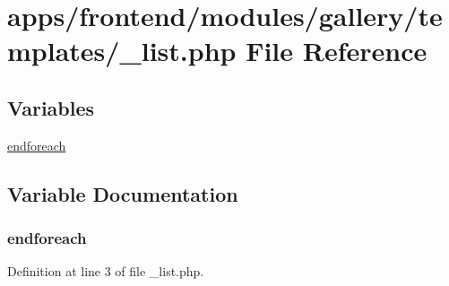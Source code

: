 \hypertarget{frontend_2modules_2gallery_2templates_2__list_8php}{\section{apps/frontend/modules/gallery/templates/\-\_\-list.php File Reference}
\label{frontend_2modules_2gallery_2templates_2__list_8php}
}
\subsection*{Variables}
\begin{DoxyCompactItemize}
\item 
\hyperlink{frontend_2modules_2gallery_2templates_2__list_8php_a672d9707ef91db026c210f98cc601123}{endforeach}
\end{DoxyCompactItemize}


\subsection{Variable Documentation}
\hypertarget{frontend_2modules_2gallery_2templates_2__list_8php_a672d9707ef91db026c210f98cc601123}{
\subsubsection[{endforeach}]{\setlength{\rightskip}{0pt plus 5cm}endforeach}}\label{frontend_2modules_2gallery_2templates_2__list_8php_a672d9707ef91db026c210f98cc601123}


Definition at line 3 of file \-\_\-list.\-php.

